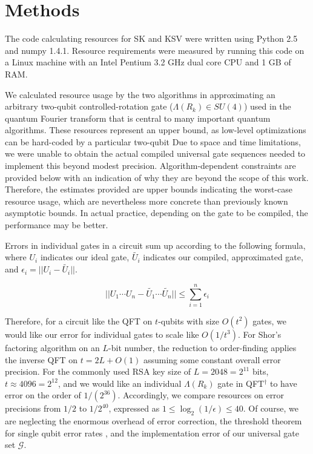 \section{Methods}
\label{sec:methods}

The code calculating resources for SK and KSV were written using Python 2.5 and
numpy 1.4.1.
Resource requirements were measured by running this code on
a Linux machine with an Intel Pentium 3.2 GHz dual core CPU and 1 GB of RAM.

We calculated resource usage by the two algorithms in approximating an
arbitrary two-qubit
controlled-rotation gate ($\Lambda(R_k) \in SU(4)$) used in the quantum Fourier
transform that is central to many important quantum algorithms.
These resources represent an upper bound, as low-level optimizations can be
hard-coded by a particular two-qubit
Due to space and time limitations, we were unable to obtain the actual
compiled universal gate
sequences needed to implement this beyond modest precision.
Algorithm-dependent constraints are provided below with an indication of
why they are beyond the scope of this work.
Therefore, the estimates provided are upper bounds indicating
the worst-case resource usage, which are nevertheless more concrete than
previously known asymptotic bounds. In actual practice, depending on the gate
to be compiled, the performance may be better.

Errors in individual gates in a circuit sum up according to the following
formula, where $U_i$ indicates our ideal gate, $\tilde{U_i}$ indicates our
compiled, approximated gate, and $\epsilon_i  = || U_i - \tilde{U_i} ||$.

\begin{displaymath}
|| U_1\cdots U_n - \tilde{U_1}\cdots\tilde{U_n} || \le \sum_{i=1}^n \epsilon_i
\end{displaymath}

Therefore, for a circuit like the QFT on $t$-qubits with size $O(t^2)$ gates,
we would like our error for individual gates to scale like $O(1/t^3)$.
For Shor's factoring algorithm on an $L$-bit number, the reduction to
order-finding applies the inverse QFT on $t = 2L + O(1)$ assuming some constant
overall error precision. For the commonly used RSA key size of
$L = 2048 = 2^11$ bits, $t \approx 4096 = 2^12$, and we would like an individual
$\Lambda(R_k)$ gate in QFT$^{\dag}$ to have error on the order of
$1/(2^36)$. Accordingly, we compare resources on error precisions from
$1/2$ to $1/2^40$, expressed as $1 \le \log_2(1/\epsilon) \le 40$. Of course,
we are neglecting the enormous overhead of error correction, the threshold
theorem for single qubit error rates \cite{nc00}, and the implementation error
of our universal gate set $\mathcal{G}$.

